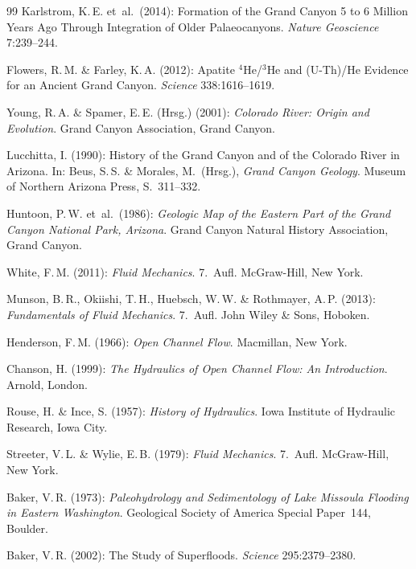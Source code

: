 ﻿\documentclass[12pt,a4paper]{report}
\begin{document}
\begin{thebibliography}{99}
Karlstrom, K.\,E. et\ al.\ (2014): Formation of the Grand Canyon 5 to 6 Million Years Ago Through Integration of Older Palaeocanyons. \textit{Nature Geoscience} 7:239--244.

Flowers, R.\,M. \& Farley, K.\,A. (2012): Apatite $^4$He/$^3$He and (U-Th)/He Evidence for an Ancient Grand Canyon. \textit{Science} 338:1616--1619.

Young, R.\,A. \& Spamer, E.\,E. (Hrsg.) (2001): \textit{Colorado River: Origin and Evolution}. Grand Canyon Association, Grand Canyon.

Lucchitta, I. (1990): History of the Grand Canyon and of the Colorado River in Arizona. In: Beus, S.\,S. \& Morales, M.\ (Hrsg.), \textit{Grand Canyon Geology}. Museum of Northern Arizona Press, S.\ 311--332.

Huntoon, P.\,W. et\ al.\ (1986): \textit{Geologic Map of the Eastern Part of the Grand Canyon National Park, Arizona}. Grand Canyon Natural History Association, Grand Canyon.


White, F.\,M. (2011): \textit{Fluid Mechanics}. 7.\ Aufl. McGraw-Hill, New York.

Munson, B.\,R., Okiishi, T.\,H., Huebsch, W.\,W. \& Rothmayer, A.\,P. (2013): \textit{Fundamentals of Fluid Mechanics}. 7.\ Aufl. John Wiley \& Sons, Hoboken.

Henderson, F.\,M. (1966): \textit{Open Channel Flow}. Macmillan, New York.

Chanson, H. (1999): \textit{The Hydraulics of Open Channel Flow: An Introduction}. Arnold, London.

Rouse, H. \& Ince, S. (1957): \textit{History of Hydraulics}. Iowa Institute of Hydraulic Research, Iowa City.

Streeter, V.\,L. \& Wylie, E.\,B. (1979): \textit{Fluid Mechanics}. 7.\ Aufl. McGraw-Hill, New York.


Baker, V.\,R. (1973): \textit{Paleohydrology and Sedimentology of Lake Missoula Flooding in Eastern Washington}. Geological Society of America Special Paper~144, Boulder.

Baker, V.\,R. (2002): The Study of Superfloods. \textit{Science} 295:2379--2380.


\end{thebibliography}
\end{document}

